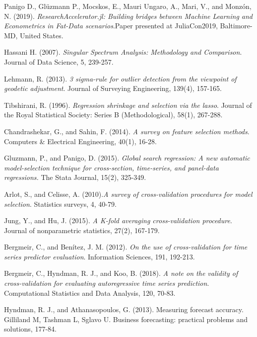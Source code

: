 \documentclass{article}
\begin{document}
\renewcommand{\refname}{ModelSelection References}
  
\begin{thebibliography}{1}
  
Panigo D., Glüzmann P., Mocskos, E., Mauri Ungaro, A., Mari, V., and Monzón, N. (2019). \textit{ResearchAccelerator.jl: Building bridges between Machine Learning and Econometrics in Fat-Data scenarios}.Paper presented at JuliaCon2019, Baltimore-MD, United States.
  
Hassani H. (2007). \textit{Singular Spectrum Analysis: Methodology and Comparison}. Journal of Data Science, 5, 239-257.
  
Lehmann, R. (2013). \textit{3 sigma-rule for outlier detection from the viewpoint of geodetic adjustment}. Journal of Surveying Engineering, 139(4), 157-165.

Tibshirani, R. (1996). \textit{Regression shrinkage and selection via the lasso}. Journal of the Royal Statistical Society: Series B (Methodological), 58(1), 267-288.

Chandrashekar, G., and Sahin, F. (2014). \textit{A survey on feature selection methods}. Computers \& Electrical Engineering, 40(1), 16-28.

Gluzmann, P., and Panigo, D. (2015). \textit{Global search regression: A new automatic model-selection technique for cross-section, time-series, and panel-data regressions.} The Stata Journal, 15(2), 325-349.

Arlot, S., and Celisse, A. (2010).\textit{A survey of cross-validation procedures for model selection}. Statistics surveys, 4, 40-79.

Jung, Y., and Hu, J. (2015). \textit{A K-fold averaging cross-validation procedure}. Journal of nonparametric statistics, 27(2), 167-179.

Bergmeir, C., and Benítez, J. M. (2012). \textit{On the use of cross-validation for time series predictor evaluation}. Information Sciences, 191, 192-213.

Bergmeir, C., Hyndman, R. J., and Koo, B. (2018). \textit{A note on the validity of cross-validation for evaluating autoregressive time series prediction}. Computational Statistics and Data Analysis, 120, 70-83.

Hyndman, R. J., and Athanasopoulos, G. (2013). Measuring forecast accuracy. Gilliland M, Tashman L, Sglavo U. Business forecasting: practical problems and solutions, 177-84.
\end{thebibliography}
\end{document}
